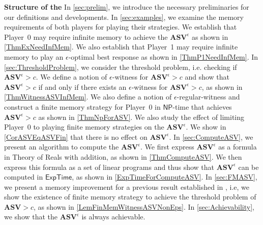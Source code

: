 \textbf{Structure of the \document} In \cref{sec:prelim}, we introduce the necessary preliminaries for our definitions and developments. 
In \cref{sec:examples}, we examine the memory requirements of both players for playing their strategies. We establish that Player~0 may require infinite memory to achieve the $\mathbf{ASV}^{\epsilon}$ as shown in \cref{ThmExNeedInfMem}. We also establish that Player~1 may require infinite memory to play an $\epsilon$-optimal best response as shown in \cref{ThmP1NeedInfMem}. 
In \cref{sec:ThresholdProblem}, we consider the threshold problem, i.e. checking if $\mathbf{ASV}^{\epsilon} > c$. We define a notion of $\epsilon$-witness for $\mathbf{ASV}^{\epsilon} > c$ and show that $\mathbf{ASV}^{\epsilon} > c$ if and only if there exists an $\epsilon$-witness for $\mathbf{ASV}^{\epsilon} > c$, as shown in \cref{ThmWitnessASVInfMem}. We also define a notion of $\epsilon$-regular-witness and construct a finite memory strategy for Player~0 in $\mathsf{NP}$-time that achieves $\mathbf{ASV}^{\epsilon} > c$ as shown in \cref{ThmNpForASV}. We also study the effect of limiting Player~0 to playing finite memory strategies on the $\mathbf{ASV}^{\epsilon}$. We show in \cref{CorASVEqASVFin} that there is no effect on $\mathbf{ASV}^{\epsilon}$.
In \cref{sec:ComputeASV}, we present an algorithm to compute the $\mathbf{ASV}^{\epsilon}$. We first express $\mathbf{ASV}^{\epsilon}$ as a formula in Theory of Reals with addition, as shown in \cref{ThmComputeASV}. We then express this formula as a set of linear programs and thus show that $\mathbf{ASV}^{\epsilon}$ can be computed in $\mathsf{ExpTime}$, as shown in \cref{ExpTimeForComputeASV}.
In \cref{sec:FMASV}, we present a memory improvement for a previous result established in \cite{FGR20}, i.e, we show the existence of finite memory strategy to achieve the threshold problem of $\mathbf{ASV} > c$, as shown in \cref{LemFinMemWitnessASVNonEps}. 
In \cref{sec:Achievability}, we show that the $\mathbf{ASV}^{\epsilon}$ is always achievable.